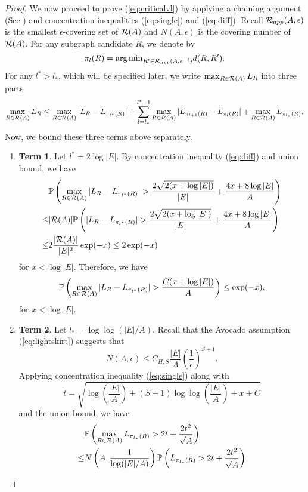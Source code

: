 \begin{proof}
We now proceed to prove (\ref{eq:criticalvl}) by applying a chaining argument (See \cite{talagrand2006generic}) and concentration inequalities (\ref{eq:single}) and (\ref{eq:diff}).
Recall $\mathcal{R}_{app}(A,\epsilon)$ is the smallest $\epsilon$-covering set of $\mathcal{R}(A)$ and $N(A,\epsilon)$ is the covering number of $\mathcal{R}(A)$.
For any subgraph candidate $R$, we denote by
$$
\pi_l(R)={\arg\min}_{R'\in \mathcal{R}_{app}(A,e^{-l})} d(R,R').
$$
For any $l^\ast>l_\ast$, which will be specified later, we write $\max_{R\in\mathcal{R}(A)}L_R$ into three parts
$$
\max_{R\in\mathcal{R}(A)}L_R\le \max_{R\in\mathcal{R}(A)}|L_R-L_{\pi_{l^\ast}(R)}|+\sum_{l=l_\ast}^{l^\ast-1}\max_{R\in\mathcal{R}(A)}|L_{\pi_{l+1}(R)}-L_{\pi_{l}(R)}|+\max_{R\in\mathcal{R}(A)}L_{\pi_{l_\ast}(R)}.
$$
Now, we bound these three terms above separately.
\begin{enumerate}
\item[] \textbf{Term 1}. Let $l^\ast=2\log |E|$. By concentration inequality (\ref{eq:diff}) and union bound, we have 
\begin{align*}
& \PP\left(\max_{R\in\cR(A)}|L_R-L_{\pi_{l^\ast}(R)}|>\frac{2\sqrt{2(x+\log|E|)}}{|E|}+\frac{4x+8\log |E|}{A}\right)\\
\le & |\cR(A)| \PP\left(|L_R-L_{\pi_{l^\ast}(R)}|>\frac{2\sqrt{2(x+\log|E|)}}{|E|}+\frac{4x+8\log |E|}{A}\right)\\
\le & 2\frac{|\cR(A)|}{|E|^2}\exp(-x)\le 2\exp(-x) 
\end{align*}
for $x<\log |E|$. Therefore, we have
$$
\PP\left(\max_{R\in\cR(A)}|L_R-L_{\pi_{l^\ast}(R)}|>\frac{C(x+\log |E|)}{A}\right)\le \exp(-x),
$$
for $x<\log |E|$.
\item[] \textbf{Term 2}. Let $l_\ast=\log\log (|E|/A)$. 
Recall that the Avocado assumption (\ref{eq:lightskirt}) suggests that
\begin{equation}
\label{eq:cvnum}
N(A,\epsilon)\le C_{H,S}\frac{|E|}{A}\left(\frac{1}{ \epsilon}\right)^{S+1}.
\end{equation}
Applying concentration inequality (\ref{eq:single}) along with
\begin{equation}
t=\sqrt{\log\left(\frac{|E|}{ A}\right)+(S+1)\log\log\left(\frac{|E|}{A}\right)+x+C}
\end{equation}
and the union bound, we have 
\begin{align*}
&\PP\left(\max_{R\in\cR(A)}L_{\pi_{l_\ast}(R)}>2t+\frac{2t^2}{\sqrt{A}}\right)\\
\le & N\left(A,\frac{1}{\log (|E|/A)}\right) \PP\left(L_{\pi_{l_\ast}(R)}>2t+\frac{2t^2}{ \sqrt{A}}\right)\\

\end{align*}
\end{enumerate}
\end{proof}

